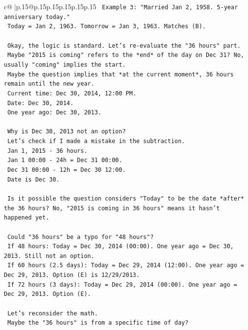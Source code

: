 \documentclass{article}
\begin{document}
{\begin{supertabular}{c@{$\;$}|p{.15\linewidth}@{}p{.15\linewidth}p{.15\linewidth}p{.15\linewidth}p{.15\linewidth}p{.15\linewidth}}
{{{\texttt{    Example 3: "Married Jan 2, 1958. 5{-}year anniversary today."} \\
\texttt{    Today = Jan 2, 1963. Tomorrow = Jan 3, 1963. Matches (B).} \\
\\ 
\texttt{    Okay, the logic is standard. Let's re{-}evaluate the "36 hours" part.} \\
\texttt{    Maybe "2015 is coming" refers to the *end* of the day on Dec 31? No, usually "coming" implies the start.} \\
\texttt{    Maybe the question implies that *at the current moment*, 36 hours remain until the new year.} \\
\texttt{    Current time: Dec 30, 2014, 12:00 PM.} \\
\texttt{    Date: Dec 30, 2014.} \\
\texttt{    One year ago: Dec 30, 2013.} \\
\\ 
\texttt{    Why is Dec 30, 2013 not an option?} \\
\texttt{    Let's check if I made a mistake in the subtraction.} \\
\texttt{    Jan 1, 2015 {-} 36 hours.} \\
\texttt{    Jan 1 00:00 {-} 24h = Dec 31 00:00.} \\
\texttt{    Dec 31 00:00 {-} 12h = Dec 30 12:00.} \\
\texttt{    Date is Dec 30.} \\
\\ 
\texttt{    Is it possible the question considers "Today" to be the date *after* the 36 hours? No, "2015 is coming in 36 hours" means it hasn't happened yet.} \\
\\ 
\texttt{    Could "36 hours" be a typo for "48 hours"?} \\
\texttt{    If 48 hours: Today = Dec 30, 2014 (00:00). One year ago = Dec 30, 2013. Still not an option.} \\
\texttt{    If 60 hours (2.5 days): Today = Dec 29, 2014 (12:00). One year ago = Dec 29, 2013. Option (E) is 12/29/2013.} \\
\texttt{    If 72 hours (3 days): Today = Dec 29, 2014 (00:00). One year ago = Dec 29, 2013. Option (E).} \\
\\ 
\texttt{    Let's reconsider the math.} \\
\texttt{    Maybe the "36 hours" is from a specific time of day?} \\
}}}
\end{supertabular}}
\end{document}
